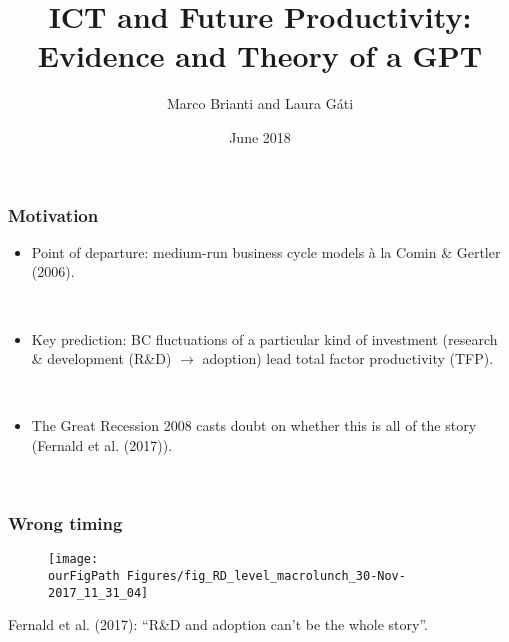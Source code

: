 \documentclass{beamer}
\author[Brianti, G\'ati]{Marco Brianti and Laura G\'ati}
\institute[Boston College]{Boston College}
\title[ICT \& medium-run TFP]{ICT and Future Productivity: Evidence and Theory of a GPT}
\date{June 2018}
\def \ourFigPath {../../}
\begin{document}
\begin{frame}

\maketitle


\end{frame}





\begin{frame}
	\frametitle{Motivation}
	
	\begin{itemize}
		
		\item Point of departure: medium-run business cycle models \`a la Comin \& Gertler (2006).
		
		\
		
		\item Key prediction: BC fluctuations of a particular kind of investment (research \& development (R\&D) $\rightarrow$ adoption) lead total factor productivity (TFP).
		
		\
		
	\item The Great Recession 2008 casts doubt on whether this is all of the story (Fernald et al. (2017)).
	
	\
	
	
	\end{itemize} 

\end{frame}

\begin{frame}
	\frametitle{Wrong timing}
	
		\vspace{-1cm}
	\noindent
	\begin{figure}
		\centering
		\texttt{[image: \\ourFigPath Figures/fig\_RD\_level\_macrolunch\_30-Nov-2017\_11\_31\_04]}
	\end{figure}
	
	Fernald et al. (2017): ``R\&D and adoption can't be the whole story''.

\end{frame}
\end{document}

